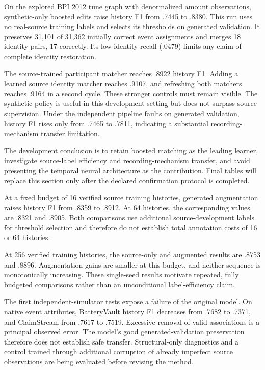 \documentclass[11pt]{article}
\begin{document}
On the explored BPI 2012 tune graph with denormalized amount observations, synthetic-only boosted edits raise history F1 from .7445 to .8380. This run uses no real-source training labels and selects its thresholds on generated validation. It preserves 31,101 of 31,362 initially correct event assignments and merges 18 identity pairs, 17 correctly. Its low identity recall (.0479) limits any claim of complete identity restoration.

The source-trained participant matcher reaches .8922 history F1. Adding a learned source identity matcher reaches .9107, and refreshing both matchers reaches .9164 in a second cycle. These stronger controls must remain visible. The synthetic policy is useful in this development setting but does not surpass source supervision. Under the independent pipeline faults on generated validation, history F1 rises only from .7465 to .7811, indicating a substantial recording-mechanism transfer limitation.

The development conclusion is to retain boosted matching as the leading learner, investigate source-label efficiency and recording-mechanism transfer, and avoid presenting the temporal neural architecture as the contribution. Final tables will replace this section only after the declared confirmation protocol is completed.

At a fixed budget of 16 verified source training histories, generated augmentation raises history F1 from .8359 to .8912. At 64 histories, the corresponding values are .8321 and .8905. Both comparisons use additional source-development labels for threshold selection and therefore do not establish total annotation costs of 16 or 64 histories.

At 256 verified training histories, the source-only and augmented results are .8753 and .8896. Augmentation gains are smaller at this budget, and neither sequence is monotonically increasing. These single-seed results motivate repeated, fully budgeted comparisons rather than an unconditional label-efficiency claim.

The first independent-simulator tests expose a failure of the original model. On native event attributes, BatteryVault history F1 decreases from .7682 to .7371, and ClaimStream from .7617 to .7519. Excessive removal of valid associations is a principal observed error. The model's good generated-validation preservation therefore does not establish safe transfer. Structural-only diagnostics and a control trained through additional corruption of already imperfect source observations are being evaluated before revising the method.
\end{document}
